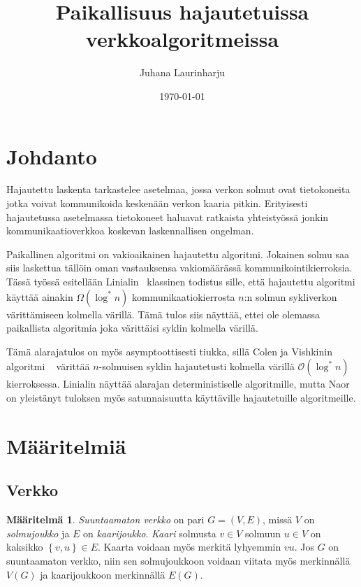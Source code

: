\documentclass[finnish]{tktltiki2}
\title{Paikallisuus hajautetuissa verkkoalgoritmeissa}
\author{Juhana Laurinharju}
\date{\today}
\theoremstyle{definition}
\newtheorem{maar}[lau]{Määritelmä}
\theoremstyle{remark}
\newcommand{\set}[1]{\left\{ #1 \right\}}
\begin{document}

\maketitle        %
\makeabstract     %

\tableofcontents  %
\newpage          %



\section{Johdanto}

Hajautettu laskenta tarkastelee asetelmaa, jossa verkon solmut ovat
tietokoneita jotka voivat kommunikoida keskenään verkon kaaria pitkin.
Erityisesti hajautetussa asetelmassa tietokoneet haluavat ratkaista
yhteistyössä jonkin kommunikaatioverkkoa koskevan laskennallisen ongelman.

Paikallinen algoritmi on vakioaikainen hajautettu algoritmi. Jokainen solmu saa
siis laskettua tällöin oman vastauksensa vakiomäärässä kommunikointikierroksia.
Tässä työssä esitellään Linialin~\cite{linial92} klassinen todistus sille, että
hajautettu algoritmi käyttää ainakin $\Omega(\log^* n)$ kommunikaatiokierrosta
$n$:n solmun sykliverkon värittämiseen kolmella värillä. Tämä tulos siis
näyttää, ettei ole olemassa paikallista algoritmia joka värittäisi syklin
kolmella värillä.

Tämä alarajatulos on myös asymptoottisesti tiukka, sillä Colen ja Vishkinin
algoritmi ~\cite{colevishkin86} värittää $n$-solmuisen syklin hajautetusti
kolmella värillä $\mathcal{O}(\log^* n)$ kierroksessa. Linialin näyttää
alarajan deterministiselle algoritmille, mutta Naor~\cite{naor91} on yleistänyt
tuloksen myös satunnaisuutta käyttäville hajautetuille algoritmeille.

\section{Määritelmiä}

\subsection{Verkko}

\begin{maar}
    \emph{Suuntaamaton verkko} on pari $G = (V,E)$, missä $V$ on
    \emph{solmujoukko} ja $E$ on \emph{kaarijoukko}. \emph{Kaari} solmusta $v
    \in V$ solmuun $u \in V$ on kaksikko $\set{v,u} \in E$. Kaarta voidaan myös
    merkitä lyhyemmin $vu$. Jos $G$ on suuntaamaton verkko, niin sen
    solmujoukkoon voidaan viitata myös merkinnällä $V(G)$ ja kaarijoukkoon
    merkinnällä $E(G)$.
\end{maar}
\end{document}
